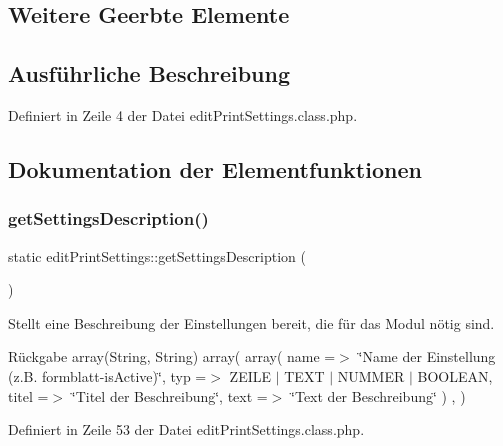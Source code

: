 \subsection*{Weitere Geerbte Elemente}


\subsection{Ausführliche Beschreibung}


Definiert in Zeile 4 der Datei edit\+Print\+Settings.\+class.\+php.



\subsection{Dokumentation der Elementfunktionen}
\mbox{\label{classedit_print_settings_a4534915748f7bd6f5e7bea003d6d2214}} 
\subsubsection{\texorpdfstring{get\+Settings\+Description()}{getSettingsDescription()}}
{\footnotesize\ttfamily static edit\+Print\+Settings\+::get\+Settings\+Description (\begin{DoxyParamCaption}{ }\end{DoxyParamCaption})\hspace{0.3cm}{\ttfamily [static]}}

Stellt eine Beschreibung der Einstellungen bereit, die für das Modul nötig sind. \begin{DoxyReturn}{Rückgabe}
array(\+String, String) array( array( \textquotesingle{}name\textquotesingle{} =$>$ \char`\"{}\+Name der Einstellung (z.\+B. formblatt-\/is\+Active)\char`\"{}, \textquotesingle{}typ\textquotesingle{} =$>$ Z\+E\+I\+LE $\vert$ T\+E\+XT $\vert$ N\+U\+M\+M\+ER $\vert$ B\+O\+O\+L\+E\+AN, \textquotesingle{}titel\textquotesingle{} =$>$ \char`\"{}\+Titel der Beschreibung\char`\"{}, \textquotesingle{}text\textquotesingle{} =$>$ \char`\"{}\+Text der Beschreibung\char`\"{} ) , ) 
\end{DoxyReturn}


Definiert in Zeile 53 der Datei edit\+Print\+Settings.\+class.\+php.

